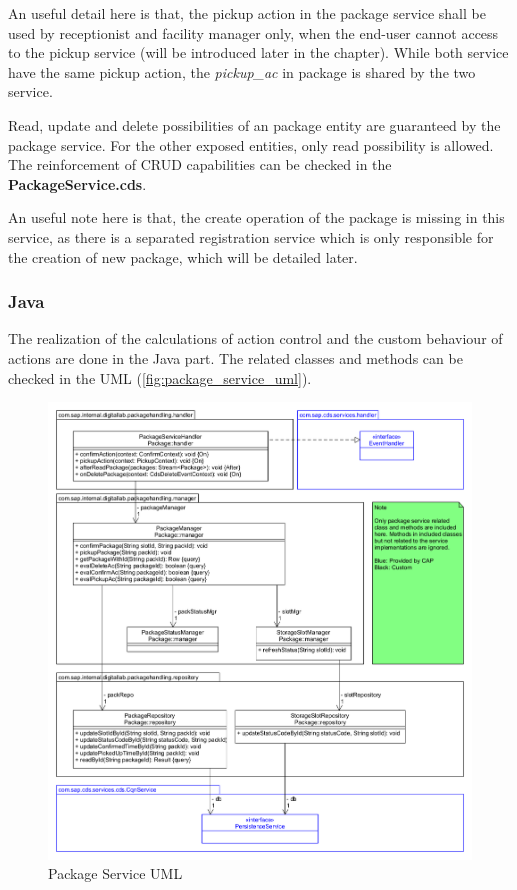 \bigskip
An useful detail here is that, the pickup action in the package service shall be used by receptionist and facility manager only, when the end-user cannot access to the pickup service (will be introduced later in the chapter). While both service have the same pickup action, the \textit{pickup\_ac} in package is shared by the two service.

\bigskip
Read, update and delete possibilities of an package entity are guaranteed by the package service. For the other exposed entities, only read possibility is allowed. The reinforcement of CRUD capabilities can be checked in the \textbf{PackageService.cds}. 

\bigskip
An useful note here is that, the create operation of the package is missing in this service, as there is a separated registration service which is only responsible for the creation of new package, which will be detailed later.

\subsubsection{Java}

The realization of the calculations of action control and the custom behaviour of actions are done in the Java part. The related classes and methods can be checked in the UML (\autoref{fig:package_service_uml}). 

\begin{figure}[!h]
    \centering
    \includegraphics[width=1\linewidth]{images/service_class_diagrams/package_service_class_diagram.png}
    \caption{Package Service UML}
    \label{fig:package_service_uml}
\end{figure}
\pagebreak



